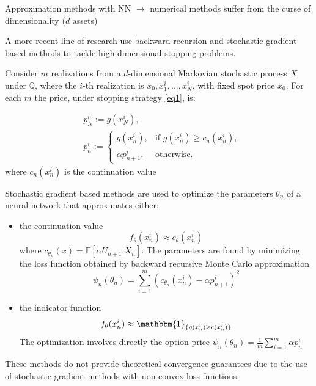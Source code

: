\documentclass[9pt]{beamer} %
\newcommand{\gooditem}[1]{\setbeamercolor{item}{fg=darkred}\item #1}
\begin{document}
\begin{frame}{Approximation methods with NN}
$\rightarrow$ numerical methods suffer from the curse of dimensionality ($d$ assets)

\medskip
A more recent line of research use backward recursion and stochastic gradient based methods to tackle high dimensional stopping problems.
\medskip

Consider $m$ realizations from a $d$-dimensional Markovian stochastic process $X$ under $\mathbb{Q}$, where the $i$-th realization is $x_0, x_1^i, \ldots, x_N^i$, with fixed spot price $x_0$. For each $m$ the price, under stopping strategy \ref{eq1}, is:


\begin{equation}\label{eq5}
       \begin{split}
           &p_N^i := g(x^i_N),\\
           &p_n^i := \begin{cases} 
       g(x^i_n), & \mbox{if } g(x^i_n) \geq c_n(x^i_n), \\ 
          \alpha p^i_{n+1}, & \mbox{otherwise.}  \end{cases}
       \end{split}   
       \end{equation}
where $c_n(x_n^i)$ is the continuation value       
\end{frame}
 
\begin{frame}{}
Stochastic gradient based methods are used to optimize the parameters $\theta_n$ of a neural network that approximates either: 
\begin{itemize}
\gooditem the continuation value \citep{kohler2010pricing, lapeyre2021neural, becker2020pricing}
    \begin{equation}\label{eq5}
       f_{\theta}(x_n^i) \approx c_{\theta}(x_n^i) 
    \end{equation}
   where $c_{\theta_n}(x) = \mathbb{E}[\alpha U_{n+1}| X_n]$. The parameters are found by minimizing the loss function obtained by backward recursive Monte Carlo approximation
   \begin{equation}\label{eq6}
       \psi_n (\theta_n) = \sum_{i=1}^m (c_{\theta_n}(x_n^i)- \alpha p^i_{n+1})^2
   \end{equation}
\gooditem the indicator function \citep{becker2019deep}
    \begin{equation}\label{eq7}
       f_{\theta}(x_n^i) \approx \mathbbm{1}_{\{ g(x_n^i) \geq c(x_n^i) \}}
    \end{equation}
    The optimization involves directly the option price $\psi_n(\theta_n) = \frac{1}{m} \sum_{i=1}^m \alpha p^i_n$
\end{itemize}

These methods do not provide theoretical convergence guarantees due to the use of stochastic gradient methods with non-convex loss functions. 
\end{frame}
\end{document}
